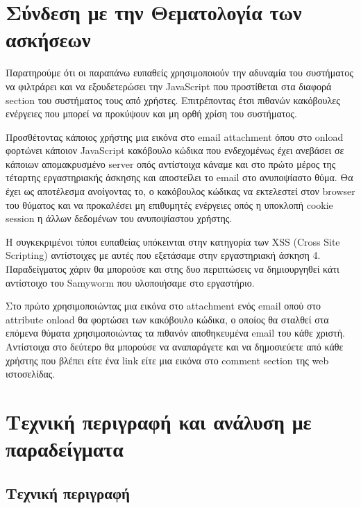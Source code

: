 %
%

\setcounter{section}{1}
\section{Σύνδεση με την Θεματολογία των ασκήσεων}

\noindent
Παρατηρούμε ότι οι παραπάνω ευπαθείς χρησιμοποιούν την αδυναμία του συστήματος να φιλτράρει και να εξουδετερώσει την JavaScript που προστίθεται στα διαφορά section του συστήματος τους από χρήστες. Επιτρέποντας έτσι πιθανών κακόβουλες ενέργειες που μπορεί να προκύψουν και μη ορθή χρίση του συστήματος. 

\noindent
Προσθέτοντας κάποιος χρήστης μια εικόνα στο email attachment όπου στο onload φορτώνει κάποιον JavaScript κακόβουλο κώδικα που ενδεχομένως έχει ανεβάσει σε κάποιων απομακρυσμένο server οπός αντίστοιχα κάναμε και στο πρώτο μέρος της τέταρτης εργαστηριακής άσκησης και αποστείλει το email στο ανυποψίαστο θύμα. Θα έχει ως αποτέλεσμα ανοίγοντας το, ο κακόβουλος κώδικας να εκτελεστεί στον browser του θύματος και να προκαλέσει μη επιθυμητές ενέργειες οπός η υποκλοπή cookie session η άλλων δεδομένων του ανυποψίαστου χρήστης. 

\noindent
Η συγκεκριμένοι τύποι ευπαθείας υπόκεινται στην κατηγορία των XSS (Cross Site Scripting) αντίστοιχες με αυτές που εξετάσαμε στην εργαστηριακή άσκηση 4. Παραδείγματος χάριν θα μπορούσε και στης δυο περιπτώσεις να δημιουργηθεί κάτι αντίστοιχο του Samyworm που υλοποιήσαμε στο εργαστήριο. 

\noindent
Στο πρώτο χρησιμοποιώντας μια εικόνα στο attachment ενός email οπού στο attribute onload θα φορτώσει των κακόβουλο κώδικα, ο οποίος θα σταλθεί στα επόμενα θύματα χρησιμοποιώντας τα πιθανόν αποθηκευμένα email του κάθε χριστή. Αντίστοιχα στο δεύτερο θα μπορούσε να αναπαράγετε και να δημοσιεύετε από κάθε χρήστης που βλέπει είτε ένα link είτε μια εικόνα στο comment section της web ιστοσελίδας. 




\section{Τεχνική περιγραφή και ανάλυση με παραδείγματα}

\subsection{Τεχνική περιγραφή}

